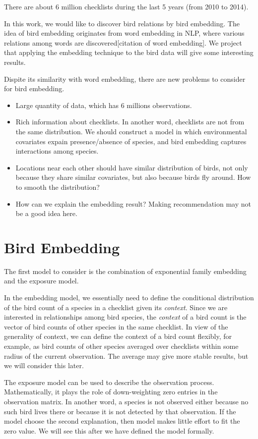 \documentclass{article}
\begin{document}
There are about 6 million checklists during the last 5 years (from 2010 to 2014). 

In this work, we would like to discover bird relations by bird embedding. The idea of bird embedding originates from word embedding in NLP, where various relations among words are discovered[citation of word embedding]. We project that applying the embedding technique to the bird data will give some interesting results. 

Dispite its similarity with word embedding, there are new problems to consider for bird embedding. 
\begin{itemize}
\item Large quantity of data, which has 6 millions observations.
\item Rich information about checklists. In another word, checklists are not from the same distribution. We should construct a model in which environmental covariates expain presence/absence of species, and bird embedding captures interactions among species.  
\item Locations near each other should have similar distribution of birds, not only because they share similar covariates, but also because birds fly around. How to smooth the distribution?
\item How can we explain the embedding result? Making recommendation may not be a good idea here. 
\end{itemize}


\section{Bird Embedding}

The first model to consider is the combination of exponential family embedding and the exposure model.

In the embedding model, we essentially need to define the conditional distribution of the bird count of a species in a checklist given its {\it context}. Since we are interested in relationships among bird species, the {\it context} of a bird count is the vector of bird counts of other species in the same checklist. In view of the generality of context, we can define the context of a bird count flexibly, for example, as bird counts of other species averaged over checklists within some radius of the current observation. The average may give more stable results, but we will consider this later. 

The exposure model can be used to describe the observation process. Mathematically, it plays the role of down-weighting zero entries in the observation matrix. In another word, a species is not observed either because no such bird lives there or because it is not detected by that observation. If the model choose the second explanation, then model makes little effort to fit the zero value. We will see this after we have defined the model formally.  
\end{document}
